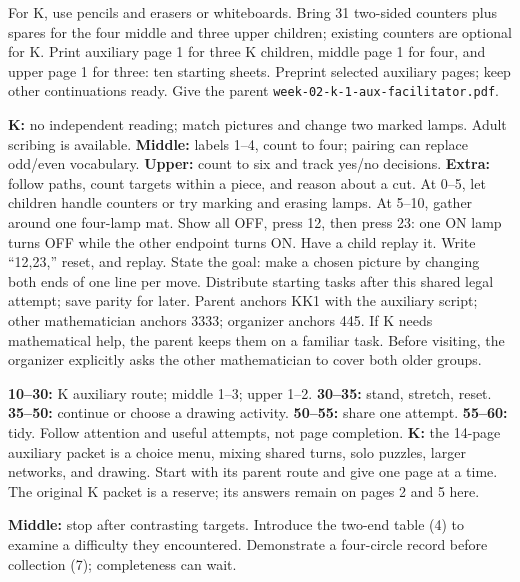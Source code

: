 \documentclass[12pt]{extarticle}
\begin{document}
For K, use pencils and erasers or whiteboards. Bring 31 two-sided counters plus spares for the four middle and three upper children; existing counters are optional for K. Print auxiliary page 1 for three K children, middle page 1 for four, and upper page 1 for three: ten starting sheets. Preprint selected auxiliary pages; keep other continuations ready. Give the parent \texttt{week-02-k-1-aux-facilitator.pdf}.\par
\textbf{K:} no independent reading; match pictures and change two marked lamps. Adult scribing is available. \textbf{Middle:} labels 1--4, count to four; pairing can replace odd/even vocabulary. \textbf{Upper:} count to six and track yes/no decisions. \textbf{Extra:} follow paths, count targets within a piece, and reason about a cut.
At 0--5, let children handle counters or try marking and erasing lamps. At 5--10, gather around one four-lamp mat. Show all OFF, press 12, then press 23: one ON lamp turns OFF while the other endpoint turns ON. Have a child replay it. Write ``12,23,'' reset, and replay. State the goal: make a chosen picture by changing both ends of one line per move. Distribute starting tasks after this shared legal attempt; save parity for later.
Parent anchors KK1 with the auxiliary script; other mathematician anchors 3333; organizer anchors 445. If K needs mathematical help, the parent keeps them on a familiar task. Before visiting, the organizer explicitly asks the other mathematician to cover both older groups.\par
\textbf{10--30:} K auxiliary route; middle 1--3; upper 1--2. \textbf{30--35:} stand, stretch, reset. \textbf{35--50:} continue or choose a drawing activity. \textbf{50--55:} share one attempt. \textbf{55--60:} tidy. Follow attention and useful attempts, not page completion.
\textbf{K:} the 14-page auxiliary packet is a choice menu, mixing shared turns, solo puzzles, larger networks, and drawing. Start with its parent route and give one page at a time. The original K packet is a reserve; its answers remain on pages 2 and 5 here.\par
\textbf{Middle:} stop after contrasting targets. Introduce the two-end table (4) to examine a difficulty they encountered. Demonstrate a four-circle record before collection (7); completeness can wait.\par
\end{document}
